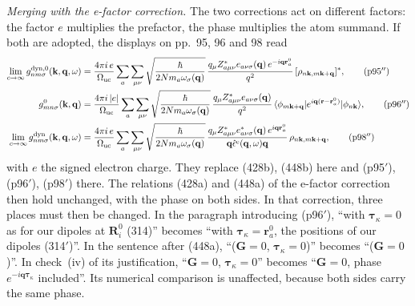 \emph{Merging with the e-factor correction.} The two corrections act on different factors: the factor $e$ multiplies the prefactor, the phase multiplies the atom summand. If both are adopted, the displays on pp.~95, 96 and 98 read
\begin{align}
\lim_{c\to\infty}g^{\rm dyn,0}_{nm\sigma}(\mathbf k,\mathbf q,\omega)&=\frac{4\pi i\,e}{\Omega_{\rm uc}}\sum_a\sum_{\mu\nu}\sqrt{\frac{\hbar}{2Nm_a\omega_\sigma(\mathbf q)}}\,\frac{q_\mu Z^*_{a\mu\nu}e_{a\nu\sigma}(\mathbf q)\,e^{-i\mathbf q\mathbf r^0_a}}{q^2}\,[\rho_{n\mathbf k,m\mathbf k+\mathbf q}]^*,\tag{p95$''$}\\
g^0_{mn\sigma}(\mathbf k,\mathbf q)&=\frac{4\pi i\,|e|}{\Omega_{\rm uc}}\sum_a\sum_{\mu\nu}\sqrt{\frac{\hbar}{2Nm_a\omega_\sigma(\mathbf q)}}\,\frac{q_\mu Z^*_{a\mu\nu}e_{a\nu\sigma}(\mathbf q)}{q^2}\,\langle\phi_{m\mathbf k+\mathbf q}|e^{i\mathbf q(\mathbf r-\mathbf r^0_a)}|\phi_{n\mathbf k}\rangle,\tag{p96$''$}\\
\lim_{c\to\infty}g^{\rm dyn}_{nm\sigma}(\mathbf k,\mathbf q,\omega)&=\frac{4\pi i\,e}{\Omega_{\rm uc}}\sum_a\sum_{\mu\nu}\sqrt{\frac{\hbar}{2Nm_a\omega_\sigma(\mathbf q)}}\,\frac{q_\mu Z^*_{a\mu\nu}e^*_{a\nu\sigma}(\mathbf q)\,e^{i\mathbf q\mathbf r^0_a}}{\mathbf q\hat\epsilon^{\rm e}(\mathbf q,\omega)\mathbf q}\,\rho_{n\mathbf k,m\mathbf k+\mathbf q},\tag{p98$''$}
\end{align}
with $e$ the signed electron charge. They replace (428b), (448b) here and (p95$'$), (p96$'$), (p98$'$) there. The relations (428a) and (448a) of the e-factor correction then hold unchanged, with the phase on both sides. In that correction, three places must then be changed. In the paragraph introducing (p96$'$), ``with $\boldsymbol\tau_\kappa=0$ as for our dipoles at $\mathbf R^0_i$ (314)'' becomes ``with $\boldsymbol\tau_\kappa=\mathbf r^0_a$, the positions of our dipoles (314$'$)''. In the sentence after (448a), ``($\mathbf G=0$, $\boldsymbol\tau_\kappa=0$)'' becomes ``($\mathbf G=0$)''. In check~(iv) of its justification, ``$\mathbf G=0$, $\boldsymbol\tau_\kappa=0$'' becomes ``$\mathbf G=0$, phase $e^{-i\mathbf q\boldsymbol\tau_\kappa}$ included''. Its numerical comparison is unaffected, because both sides carry the same phase.

